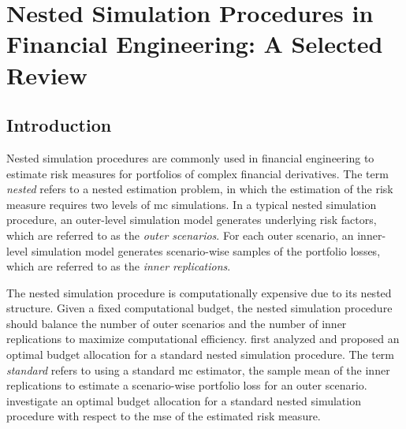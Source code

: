 \chapter{Nested Simulation Procedures in Financial Engineering: A Selected Review}\label{chap:project1}


\section{Introduction}

Nested simulation procedures are commonly used in financial engineering to estimate risk measures for portfolios of complex financial derivatives. 
The term \textit{nested} refers to a nested estimation problem, in which the estimation of the risk measure requires two levels of \gls{mc} simulations.
In a typical nested simulation procedure, an outer-level simulation model generates underlying risk factors, which are referred to as the \textit{outer scenarios}.
For each outer scenario, an inner-level simulation model generates scenario-wise samples of the portfolio losses, which are referred to as the \textit{inner replications}.

The nested simulation procedure is computationally expensive due to its nested structure. 
Given a fixed computational budget, the nested simulation procedure should balance the number of outer scenarios and the number of inner replications to maximize computational efficiency.
\cite{gordy2010nested} first analyzed and proposed an optimal budget allocation for a standard nested simulation procedure.
The term \textit{standard} refers to using a standard \gls{mc} estimator, the sample mean of the inner replications to estimate a scenario-wise portfolio loss for an outer scenario.
\cite{gordy2010nested} investigate an optimal budget allocation for a standard nested simulation procedure with respect to the \gls{mse} of the estimated risk measure.

